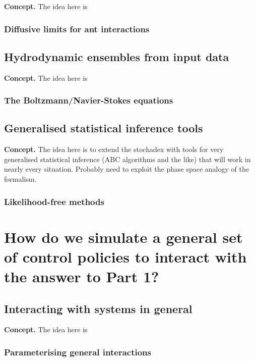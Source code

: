 \documentclass{book}
\begin{document}
{\bfseries\sffamily Concept.} The idea here is 

\section{\sffamily Diffusive limits for ant interactions}


\chapter{\sffamily Hydrodynamic ensembles from input data}

{\bfseries\sffamily Concept.} The idea here is 


\section{\sffamily The Boltzmann/Navier-Stokes equations}

\chapter{\sffamily Generalised statistical inference tools}

{\bfseries\sffamily Concept.} The idea here is to extend the stochadex with tools for very generalised statistical inference (ABC algorithms and the like) that will work in nearly every situation. Probably need to exploit the phase space analogy of the formalism.

\section{\sffamily Likelihood-free methods}


\part*{{ How do we simulate a general set of control policies to interact with the answer to Part 1?}}


\chapter{\sffamily Interacting with systems in general}

{\bfseries\sffamily Concept.} The idea here is 

\section{\sffamily Parameterising general interactions}
\end{document}

